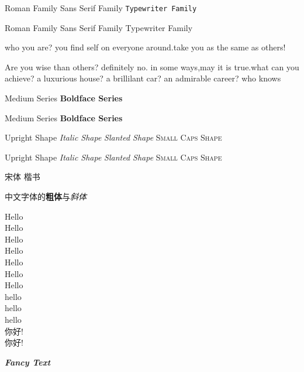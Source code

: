\documentclass[12pt]{article}
\newcommand{\myfont}{\textit{\textbf{\textsf{Fancy Text}}}}
\begin{document}
    \textrm{Roman Family}
    \textsf{Sans Serif Family}
    \texttt{Typewriter Family}

    {\rmfamily Roman Family} {\sffamily Sans Serif Family} {\ttfamily Typewriter Family}

    \sffamily who you are? you find self on everyone around.take you as the same as others!

    \ttfamily Are you wise than others? definitely no. in some ways,may it is true.what can you achieve? a luxurious house? a brillilant car? an admirable career? who knows

    \textmd{Medium Series}
    \textbf{Boldface Series}

    {\mdseries Medium Series} {\bfseries Boldface Series}

    \textup{Upright Shape}
    \textit{Italic Shape}
    \textsl{Slanted Shape}
    \textsc{Small Caps Shape}

    {\upshape Upright Shape} {\itshape Italic Shape} {\slshape Slanted Shape} {\scshape Small Caps Shape}

    {\songti 宋体}      {\kaishu 楷书}

    中文字体的\textbf{粗体}与\textit{斜体}
    
    {\tiny Hello}	\\
    {\scriptsize Hello} \\
    {\footnotesize Hello}   \\
    {\small Hello}  \\
    {\normalsize Hello} \\  %
    {\large Hello}  \\
    {\Large Hello}  \\
    {\LARGE hello}  \\
    {\huge hello}   \\
    {\Huge hello}   \\

     你好!    \\
     你好!    

    \myfont
\end{document}
